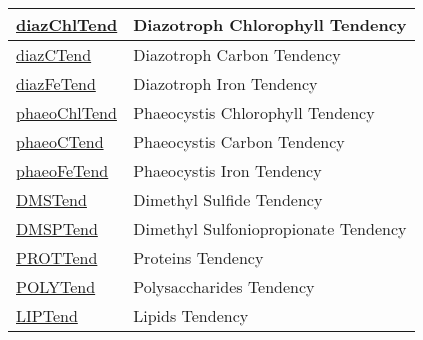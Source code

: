 {\begin{center}
\begin{longtable}{| p{2.0in} | p{4.0in} |}
    \hline
    \hyperref[subsec:var_sec_tend_diazChlTend]{diazChlTend} & Diazotroph Chlorophyll Tendency \\
    \hline
    \hyperref[subsec:var_sec_tend_diazCTend]{diazCTend} & Diazotroph Carbon Tendency \\
    \hline
    \hyperref[subsec:var_sec_tend_diazFeTend]{diazFeTend} & Diazotroph Iron Tendency \\
    \hline
    \hyperref[subsec:var_sec_tend_phaeoChlTend]{phaeoChlTend} & Phaeocystis Chlorophyll Tendency \\
    \hline
    \hyperref[subsec:var_sec_tend_phaeoCTend]{phaeoCTend} & Phaeocystis Carbon Tendency \\
    \hline
    \hyperref[subsec:var_sec_tend_phaeoFeTend]{phaeoFeTend} & Phaeocystis Iron Tendency \\
    \hline
    \hyperref[subsec:var_sec_tend_DMSTend]{DMSTend} & Dimethyl Sulfide Tendency \\
    \hline
    \hyperref[subsec:var_sec_tend_DMSPTend]{DMSPTend} & Dimethyl Sulfoniopropionate Tendency \\
    \hline
    \hyperref[subsec:var_sec_tend_PROTTend]{PROTTend} & Proteins Tendency \\
    \hline
    \hyperref[subsec:var_sec_tend_POLYTend]{POLYTend} & Polysaccharides Tendency \\
    \hline
    \hyperref[subsec:var_sec_tend_LIPTend]{LIPTend} & Lipids Tendency \\
    \hline
\end{longtable}
\end{center}
}
